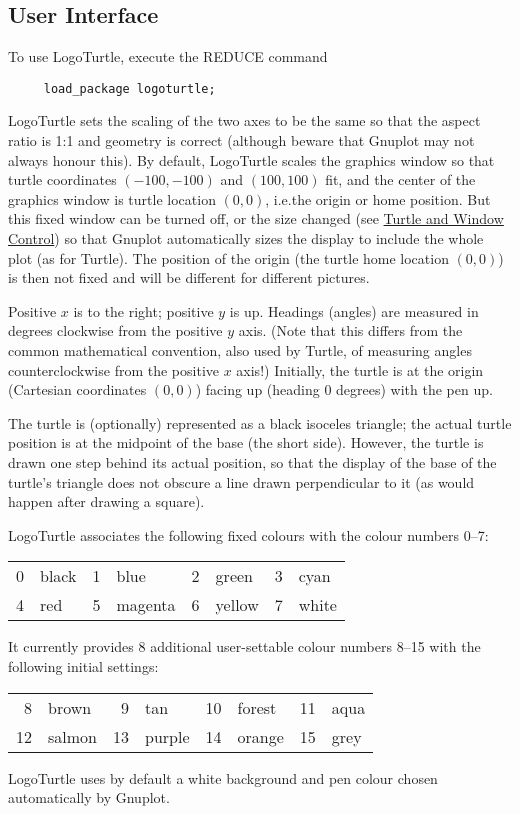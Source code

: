 \subsection{User Interface}

To use LogoTurtle, execute the REDUCE command
\begin{verbatim}
     load_package logoturtle;
\end{verbatim}

LogoTurtle sets the scaling of the two axes to be the same so that the
aspect ratio is 1:1 and geometry is correct (although beware that
Gnuplot may not always honour this).  By default, LogoTurtle scales
the graphics window so that turtle coordinates $(-100,-100)$ and
$(100,100)$ fit, and the center of the graphics window is turtle
location $(0,0)$, i.e.\@ the origin or home position.  But this fixed
window can be turned off, or the size changed (see
\hyperref[logoturtle:TWC]{Turtle and Window Control}) so that Gnuplot
automatically sizes the display to include the whole plot (as for
Turtle).  The position of the origin (the turtle home location
$(0,0)$) is then not fixed and will be different for different
pictures.

Positive $x$ is to the right; positive $y$ is up.  Headings (angles)
are measured in degrees clockwise from the positive $y$ axis.  (Note
that this differs from the common mathematical convention, also used
by Turtle, of measuring angles counterclockwise from the positive $x$
axis!)  Initially, the turtle is at the origin (Cartesian coordinates
$(0,0)$) facing up (heading 0 degrees) with the pen up.

The turtle is (optionally) represented as a black isoceles triangle;
the actual turtle position is at the midpoint of the base (the short
side).  However, the turtle is drawn one step behind its actual
position, so that the display of the base of the turtle's triangle
does not obscure a line drawn perpendicular to it (as would happen
after drawing a square).

LogoTurtle associates the following fixed colours with the colour
numbers 0--7:
\begin{center}
  \begin{tabular}{rlrlrlrl}
    0 & black  &  1 & blue    &  2 & green  &  3 & cyan  \\
    4 & red    &  5 & magenta &  6 & yellow &  7 & white
  \end{tabular}
\end{center}
It currently provides 8 additional user-settable colour numbers 8--15
with the following initial settings:
\begin{center}
  \begin{tabular}{rlrlrlrl}
     8 & brown  &  9 & tan     & 10 & forest & 11 & aqua  \\
    12 & salmon & 13 & purple  & 14 & orange & 15 & grey
  \end{tabular}
\end{center}
LogoTurtle uses by default a white background and pen colour chosen
automatically by Gnuplot.

